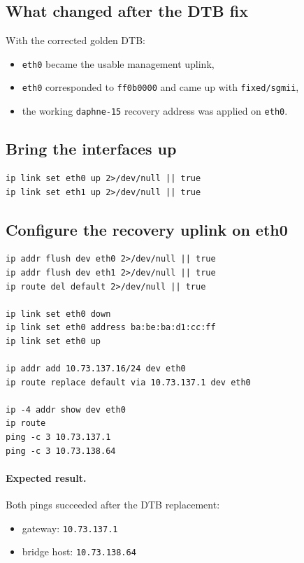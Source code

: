 \documentclass[a4paper,11pt]{article}
\begin{document}
\subsection*{What changed after the DTB fix}
With the corrected golden DTB:
\begin{itemize}
  \item \texttt{eth0} became the usable management uplink,
  \item \texttt{eth0} corresponded to \texttt{ff0b0000} and came up with
        \texttt{fixed/sgmii},
  \item the working \texttt{daphne-15} recovery address was applied on
        \texttt{eth0}.
\end{itemize}

\subsection*{Bring the interfaces up}
\begin{listing}[H]
\begin{verbatim}
ip link set eth0 up 2>/dev/null || true
ip link set eth1 up 2>/dev/null || true
\end{verbatim}
\caption{Bring the links up}
\end{listing}

\subsection*{Configure the recovery uplink on eth0}
\begin{listing}[H]
\begin{verbatim}
ip addr flush dev eth0 2>/dev/null || true
ip addr flush dev eth1 2>/dev/null || true
ip route del default 2>/dev/null || true

ip link set eth0 down
ip link set eth0 address ba:be:ba:d1:cc:ff
ip link set eth0 up

ip addr add 10.73.137.16/24 dev eth0
ip route replace default via 10.73.137.1 dev eth0

ip -4 addr show dev eth0
ip route
ping -c 3 10.73.137.1
ping -c 3 10.73.138.64
\end{verbatim}
\caption{Configure the working daphne-15 recovery uplink}
\end{listing}

\paragraph{Expected result.}
Both pings succeeded after the DTB replacement:
\begin{itemize}
  \item gateway: \texttt{10.73.137.1}
  \item bridge host: \texttt{10.73.138.64}
\end{itemize}
\end{document}

